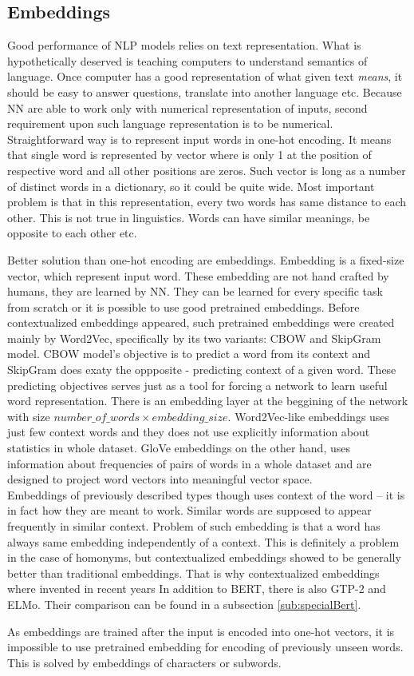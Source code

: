 \subsection{Embeddings}
Good performance of NLP models relies on text representation. What is hypothetically deserved is teaching computers to understand semantics of language. Once computer has a good representation of what given text \textit{means}, it should be easy to answer questions, translate into another language etc. Because NN are able to work only with numerical representation of inputs, second requirement upon such language representation is to be numerical. Straightforward way is to represent input words in one-hot encoding. It means that single word is represented by vector where is only 1 at the position of respective word and all other positions are zeros.%
 Such vector is long as a number of distinct words in a dictionary, so it could be quite wide. Most important problem is that in this representation, every two words has same distance to each other. This is not true in linguistics. Words can have similar meanings, be opposite to each other etc.
\par
Better solution than one-hot encoding are embeddings. Embedding is a fixed-size vector, which represent input word. These embedding are not hand crafted by humans, they are learned by NN. They can be learned for every specific task from scratch or it is possible to use good pretrained embeddings. Before contextualized embeddings appeared, such pretrained embeddings were created mainly by Word2Vec, specifically by its two variants: CBOW and SkipGram model. %
CBOW model's objective is to predict a word from its context and SkipGram does exaty the oppposite - predicting context of a given word. These predicting objectives serves just as a tool for forcing a network to learn useful word representation. There is an embedding layer at the beggining of the network with size $number\_of\_words   \times embedding\_size$. Word2Vec-like embeddings uses just few context words and they does not use explicitly information about statistics in whole dataset. GloVe %
embeddings on the other hand, uses information about frequencies of pairs of words in a whole dataset and are designed to project word vectors into meaningful vector space. 
\\
Embeddings of previously described types though uses context of the word -- it is in fact how they are meant to work. Similar words are supposed to appear frequently in similar context. Problem of such embedding is that a word has always same embedding independently of a context. This is definitely a problem in the case of homonyms, but contextualized embeddings showed to be generally better than traditional embeddings. %
That is why contextualized embeddings where invented in recent years %
In addition to BERT, there is also GTP-2 and ELMo. Their comparison can be found in a subsection \ref{sub:specialBert}. 
\par
As embeddings are trained after the input is encoded into one-hot vectors, it is impossible to use pretrained embedding for encoding of previously unseen words. This is solved by embeddings of characters or subwords.


